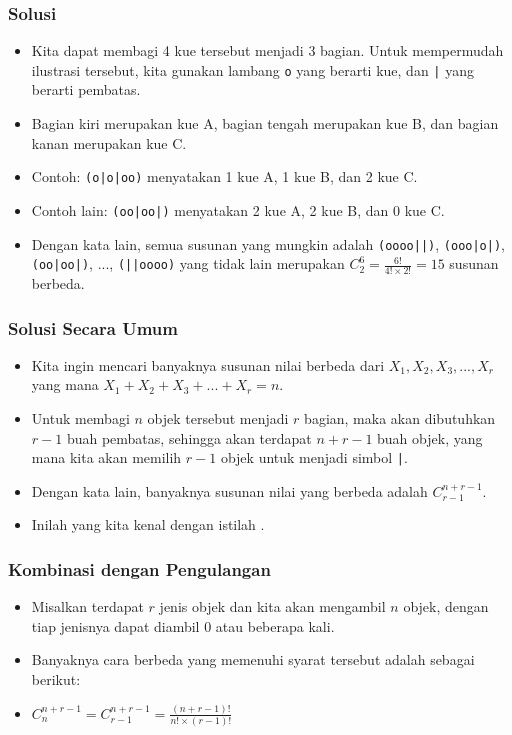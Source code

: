 \begin{frame}
\frametitle{Solusi}
\begin{itemize}
  \item Kita dapat membagi 4 kue tersebut menjadi 3 bagian. Untuk mempermudah ilustrasi tersebut, kita gunakan lambang \texttt{o} yang berarti kue, dan \texttt{|} yang berarti pembatas.
  \item Bagian kiri merupakan kue A, bagian tengah merupakan kue B, dan bagian kanan merupakan kue C.
  \item Contoh: \texttt{(o|o|oo)} menyatakan 1 kue A, 1 kue B, dan 2 kue C.
  \item Contoh lain: \texttt{(oo|oo|)} menyatakan 2 kue A, 2 kue B, dan 0 kue C.
  \item Dengan kata lain, semua susunan yang mungkin adalah \texttt{(oooo||)}, \texttt{(ooo|o|)}, \texttt{(oo|oo|)}, ..., \texttt{(||oooo)} yang tidak lain merupakan $C^{6}_{2} = \frac{6!}{4! \times 2!} = 15$ susunan berbeda.
\end{itemize}
\end{frame}

\begin{frame}
\frametitle{Solusi Secara Umum}
\begin{itemize}
  \item Kita ingin mencari banyaknya susunan nilai berbeda dari $X_{1}, X_{2}, X_{3}, ..., X_{r}$ yang mana $X_{1} + X_{2} + X_{3} + ... + X_{r} = n$.
  \item Untuk membagi $n$ objek tersebut menjadi $r$ bagian, maka akan dibutuhkan $r-1$ buah pembatas, sehingga akan terdapat $n+r-1$ buah objek, yang mana kita akan memilih $r-1$ objek untuk menjadi simbol \texttt{|}.
  \item Dengan kata lain, banyaknya susunan nilai yang berbeda adalah $C^{n+r-1}_{r-1}$.
  \item Inilah yang kita kenal dengan istilah .
\end{itemize}
\end{frame}

\begin{frame}
\frametitle{Kombinasi dengan Pengulangan}
\begin{itemize}
  \item Misalkan terdapat $r$ jenis objek dan kita akan mengambil $n$ objek, dengan tiap jenisnya dapat diambil 0 atau beberapa kali.
  \item Banyaknya cara berbeda yang memenuhi syarat tersebut adalah sebagai berikut:
  \item $C^{n+r-1}_{n} = C^{n+r-1}_{r-1} = \frac{(n+r-1)!}{n! \times (r-1)!}$
\end{itemize}
\end{frame}

